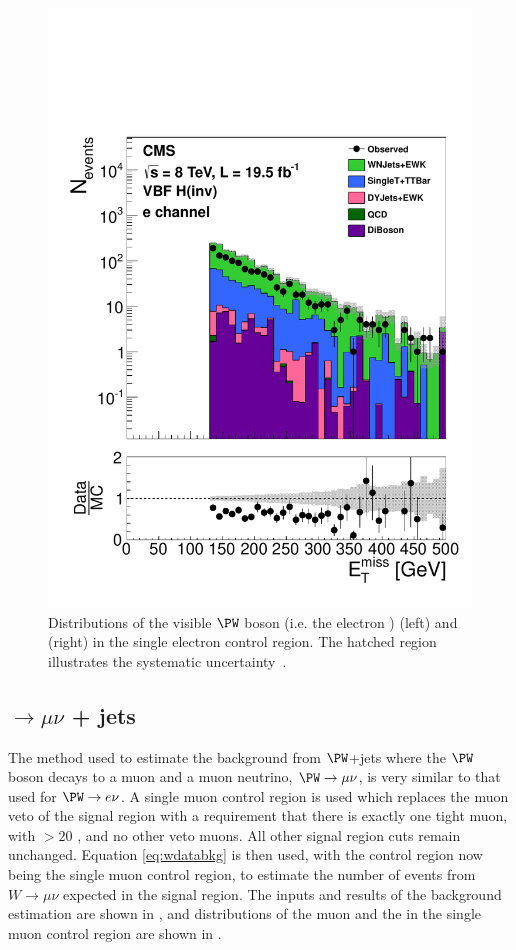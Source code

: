 \begin{figure}
  \includegraphics[width=.6\largefigwidth]{plots/prompt/AN-12-403-figs/hWEl_MET.pdf}
  \caption{Distributions of the visible $\PW$ boson \pt (i.e. the electron \pt) (left) and \MET (right) in the single electron control region. The hatched region illustrates the systematic uncertainty~\cite{ARTICLE:CMSAN-12-403}.}
  \label{fig:promptwenu}
\end{figure}

\subsection{\PW$\rightarrow \mu\nu$ + jets}
\label{sec:promptwmunu}
The method used to estimate the background from $\PW$+jets where the $\PW$ boson decays to a muon and a muon neutrino, $\PW\rightarrow\mu\nu$, is very similar to that used for $\PW\rightarrow e\nu$. A single muon control region is used which replaces the muon veto of the signal region with a requirement that there is exactly one tight muon, with \pt$>20$ \GeV, and no other veto muons. All other signal region cuts remain unchanged. Equation \ref{eq:wdatabkg} is then used, with the control region now being the single muon control region, to estimate the number of events from $W\rightarrow\mu\nu$ expected in the signal region. The inputs and results of the background estimation are shown in , and distributions of the muon \pt and the \MET in the single muon control region are shown in .

